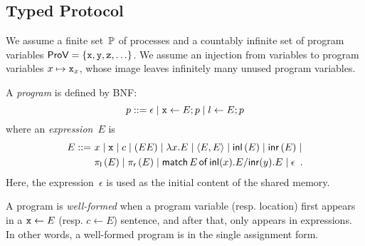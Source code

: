 \subsection{Typed Protocol}

We assume a finite set~$\mathbb{P}$
of processes and a countably infinite
set of program variables $\mathsf{ProV} =\{\texttt{x}, \texttt{y}, \texttt{z}, \ldots\}$.
We assume an injection from variables to program variables $x\mapsto
\texttt{x}_x$, whose image leaves infinitely many unused program variables.

A \textit{program} is defined by BNF:
\[
 p ::= \epsilon\mid
 \texttt{x}\leftarrow E; p \mid
 l \leftarrow E; p
\]
where an \textit{expression}~$E$ is
\begin{align*}
 E
 ::=\,\,
 &x\mid \texttt{x} \mid c \mid (EE)\mid \lambda
 x.E\mid \langle{E,E}\rangle\mid \mathsf{inl}\left({E}\right)\mid \mathsf{inr}\left({E}\right)\mid \\
 &\pi_{\mathsf l}\left({E}\right)\mid\pi_{\mathsf r}\left({E}\right)\mid  \mathsf{match}\,{E}\,\mathsf{of}\, \mathsf{inl}({x}). {E}/ \mathsf{inr}({y}). {E}\mid \epsilon\enspace.
\end{align*}
Here, the expression~$\epsilon$ is used as the initial content of the shared
memory.

\newcommand{\Wg}{W_{\mathrm g}}
\newcommand{\Wd}{W_{\mathrm d}}
A program is \textit{well-formed} when
a program variable (resp. location) first appears in a $\texttt{x}\leftarrow E$
(resp. $c\leftarrow E$)
sentence, and
after that, only appears in expressions.
In other words, a well-formed program is in the single assignment form.

